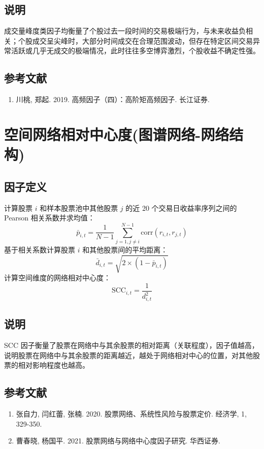 \documentclass{article}
\begin{document}
\subsection{说明}
成交量峰度类因子均衡量了个股过去一段时间的交易极端行为，与未来收益负相关；个股成交呈尖峰时，大部分时间成交在合理范围波动，但存在特定区间交易异常活跃或几乎无成交的极端情况，此时往往多空博弈激烈，个股收益不确定性强。

\subsection{参考文献}
\begin{enumerate}
    \item 川桃, 郑起. 2019. 高频因子（四）：高阶矩高频因子. 长江证券.
\end{enumerate}

\section{空间网络相对中心度(图谱网络-网络结构)}

\subsection{因子定义}
计算股票 \( i \) 和样本股票池中其他股票 \( j \) 的近 20 个交易日收益率序列之间的 Pearson 相关系数并求均值：
\begin{equation}
    \bar{p}_{i,t} = \frac{1}{N-1} \sum_{j=1, j \neq i}^{N-1} \mathrm{corr}(r_{i,t}, r_{j,t})
\end{equation}
基于相关系数计算股票 \( i \) 和其他股票间的平均距离：
\begin{equation}
    \bar{d}_{i,t} = \sqrt{2 \times (1 - \bar{p}_{i,t})}
\end{equation}
计算空间维度的网络相对中心度：
\begin{equation}
    \mathrm{SCC}_{i,t} = \frac{1}{d_{i,t}^2}
\end{equation}

\subsection{说明}
SCC 因子衡量了股票在网络中与其余股票的相对距离（关联程度），因子值越高，说明股票在网络中与其余股票的距离越近，越处于网络相对中心的位置，对其他股票的相对影响程度也越高。

\subsection{参考文献}
\begin{enumerate}
    \item 张自力, 闫红蕾, 张楠. 2020. 股票网络、系统性风险与股票定价. 经济学, 1, 329-350.
    \item 曹春晓, 杨国平. 2021. 股票网络与网络中心度因子研究. 华西证券.
\end{enumerate}
\end{document}

